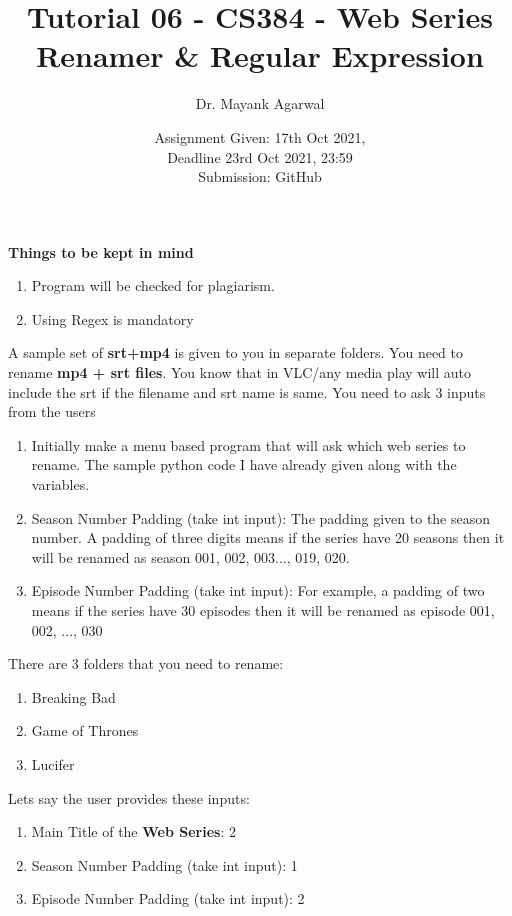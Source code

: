 \documentclass[12pt,  letterpaper,  twoside]{article}
\title{Tutorial 06 - CS384 -  Web Series Renamer \& Regular Expression}
\author{Dr. Mayank Agarwal}
\date{Assignment Given: 17th Oct 2021,\\ Deadline 23rd Oct 2021,  
	23:59\\Submission: GitHub }
\begin{document}
	\maketitle  
	\textbf{Things to be kept in mind}\\
	\begin{enumerate}
		\item Program will be checked for plagiarism.   
		\item Using Regex is mandatory
		
	\end{enumerate}
	
	A sample set of \textbf{srt+mp4} is given to you in separate folders. You 
	need to rename \textbf{mp4 + srt files}. You know that in VLC/any media 
	play will auto include the srt if the filename and srt name is same. You 
	need to ask 3 inputs from the users
	
	\begin{enumerate}
		\item Initially make a menu based program that will ask which web 
		series to 
		rename. The sample python code I have already given along with the 
		variables.
		\item Season Number Padding (take int input): The padding given to the 
		season number.  A padding of three digits means if the series have 20 
		seasons then it will be renamed as season 001, 002, 003..., 019, 020.
		\item Episode Number Padding (take int input): For example,  a padding 
		of two means if the series have 30 episodes then it will be renamed as 
		episode 001, 002, ..., 030
	\end{enumerate}
	
	There are 3 folders that you need to rename:
	\begin{enumerate}

\item  Breaking Bad
\item   Game of Thrones
\item 	Lucifer

	\end{enumerate}
	
	Lets say the user provides these inputs: 

	
	\begin{enumerate}
		\item Main Title of the \textbf{Web Series}: 2 
		\item Season Number Padding (take int input): 1
		\item Episode Number Padding (take int input): 2
	\end{enumerate} 
	
\end{document}
